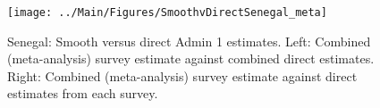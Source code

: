 \documentclass[12pt]{article}\usepackage[]{graphicx}\usepackage[]{color}
\newenvironment{knitrout}{}{} %
\begin{document}

\begin{knitrout}
\color{fgcolor}\begin{figure}[bht]

{\centering \texttt{[image: ../Main/Figures/SmoothvDirectSenegal\_meta]} 

}

\caption[Senegal]{Senegal: Smooth versus direct Admin 1 estimates. Left: Combined (meta-analysis) survey estimate against combined direct estimates. Right: Combined (meta-analysis) survey estimate against direct estimates from each survey.}\label{fig:unnamed-chunk-283}
\end{figure}


\end{knitrout}
\end{document}

